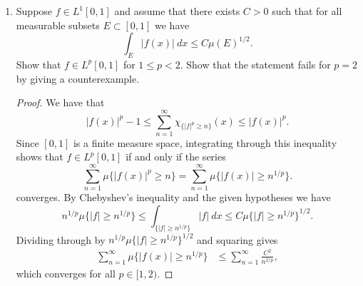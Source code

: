 \documentclass[11pt,letterpaper]{report}
\begin{document}
\begin{enumerate}
	\item Suppose $f\in L^1[0,1]$ and assume that there exists $C>0$ such that for all measurable subsets $E\subset [0,1]$ we have
	\[
	\int_E|f(x)|\ dx \leq C\mu(E)^{1/2}.
	\]
	Show that $f\in L^p[0,1]$ for $1\leq p<2$. Show that the statement fails for $p=2$ by giving a counterexample.
	\begin{proof}
		We have that
		\[
		|f(x)|^p-1 \leq \sum_{n=1}^\infty \chi_{\{|f|^p\geq n\}}(x) \leq |f(x)|^p.
		\]
		Since $[0,1]$ is a finite measure space, integrating through this inequality shows that $f\in L^p[0,1]$ if and only if the series
		\[
		\sum_{n=1}^\infty \mu\{|f(x)|^p\geq n\} = \sum_{n=1}^\infty \mu\{|f(x)|\geq n^{1/p}\}.
		\]
		converges. By Chebyshev's inequality and the given hypotheses we have
		\[
		n^{1/p}\mu\{|f|\geq n^{1/p}\} \leq \int_{\{|f|\geq n^{1/p}\}}|f|\ dx \leq C\mu\{|f|\geq n^{1/p}\}^{1/2}.
		\]
		Dividing through by $n^{1/p}\mu\{|f|\geq n^{1/p}\}^{1/2}$ and squaring gives
		\begin{align*}
		\sum_{n=1}^\infty \mu\{|f(x)|\geq n^{1/p}\} &\leq \sum_{n=1}^\infty \frac{C^2}{n^{2/p}},
		\end{align*}
		which converges for all $p\in [1, 2)$.
	\end{proof}
\end{enumerate}
\end{document}

